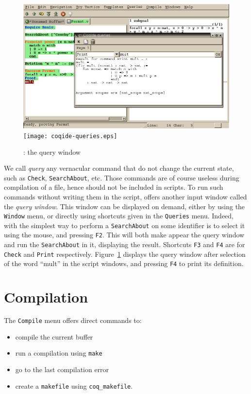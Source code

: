 \begin{figure}[t]
\begin{center}
\ifpdf  %
\includegraphics[width=1.0\textwidth]{coqide-queries.png}
\else
\texttt{[image: coqide-queries.eps]}
\fi
\end{center}
\caption{\CoqIDE{}: the query window}
\label{fig:querywindow}
\end{figure}


We call \emph{query} any vernacular command that do not change the
current state, such as \verb|Check|, \verb|SearchAbout|, etc. Those
commands are of course useless during compilation of a file, hence
should not be included in scripts. To run such commands without
writing them in the script, \CoqIDE{} offers another input window
called the \emph{query window}. This window can be displayed on
demand, either by using the \texttt{Window} menu, or directly using
shortcuts given in the \texttt{Queries} menu. Indeed, with \CoqIDE{}
the simplest way to perform a \texttt{SearchAbout} on some identifier
is to select it using the mouse, and pressing \verb|F2|. This will
both make appear the query window and run the \texttt{SearchAbout} in
it, displaying the result. Shortcuts \verb|F3| and \verb|F4| are for
\verb|Check| and \verb|Print| respectively.
Figure~\ref{fig:querywindow} displays the query window after selection
of the word ``mult'' in the script windows, and pressing \verb|F4| to
print its definition.

\section{Compilation}

The \verb|Compile| menu offers direct commands to:
\begin{itemize}
\item compile the current buffer
\item run a compilation using \verb|make|
\item go to the last compilation error
\item create a \verb|makefile| using \verb|coq_makefile|.
\end{itemize}

